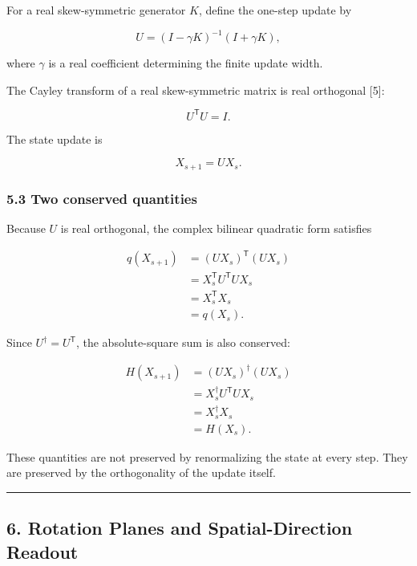 \documentclass[
  10pt,
  a4paper,
]{article}
\begin{document}
For a real skew-symmetric generator \(K\), define the one-step update by

\[
U
=
\left(I-\gamma K\right)^{-1}
\left(I+\gamma K\right),
\]

where \(\gamma\) is a real coefficient determining the finite update
width.

The Cayley transform of a real skew-symmetric matrix is real orthogonal
{[}5{]}:

\[
U^{\mathsf T}U=I.
\]

The state update is

\[
X_{s+1}=UX_s.
\]

\subsubsection{5.3 Two conserved
quantities}\label{two-conserved-quantities}

Because \(U\) is real orthogonal, the complex bilinear quadratic form
satisfies

\[
\begin{aligned}
q(X_{s+1})
&=
(UX_s)^{\mathsf T}(UX_s)\\
&=
X_s^{\mathsf T}U^{\mathsf T}UX_s\\
&=
X_s^{\mathsf T}X_s\\
&=q(X_s).
\end{aligned}
\]

Since \(U^\dagger=U^{\mathsf T}\), the absolute-square sum is also
conserved:

\[
\begin{aligned}
H(X_{s+1})
&=
(UX_s)^\dagger(UX_s)\\
&=
X_s^\dagger U^{\mathsf T}UX_s\\
&=
X_s^\dagger X_s\\
&=H(X_s).
\end{aligned}
\]

These quantities are not preserved by renormalizing the state at every
step. They are preserved by the orthogonality of the update itself.

\begin{center}\rule{0.5\linewidth}{0.5pt}\end{center}

\subsection{6. Rotation Planes and Spatial-Direction
Readout}\label{rotation-planes-and-spatial-direction-readout}
\end{document}
